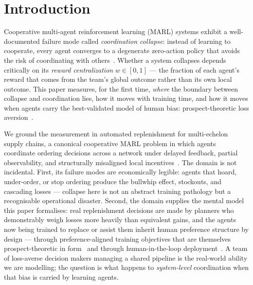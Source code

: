 \documentclass[11pt]{article}
\begin{document}
\section{Introduction}
\label{sec:intro}

Cooperative multi-agent reinforcement learning (MARL) systems exhibit a
well-documented failure mode called \emph{coordination collapse}: instead
of learning to cooperate, every agent converges to a degenerate
zero-action policy that avoids the risk of coordinating with
others~\citep{liu2023lazy,peng2023curo}.
Whether a system collapses depends critically on its \emph{reward
centralization} $w \in [0,1]$ --- the fraction of each agent's reward
that comes from the team's global outcome rather than its own local
outcome.
This paper measures, for the first time, \emph{where} the boundary
between collapse and coordination lies, how it moves with training time,
and how it moves when agents carry the best-validated model of human
bias: prospect-theoretic loss aversion~\citep{kahneman1979,tversky1992}.

We ground the measurement in automated replenishment for multi-echelon
supply chains, a canonical cooperative MARL problem in which agents
coordinate ordering decisions across a network under delayed feedback,
partial observability, and structurally misaligned local
incentives~\citep{oroojlooyjadid2022,gijsbrechts2022}.
The domain is not incidental.
First, its failure modes are economically legible: agents that hoard,
under-order, or stop ordering produce the bullwhip effect, stockouts, and
cascading losses --- collapse here is not an abstract training pathology
but a recognisable operational disaster.
Second, the domain supplies the mental model this paper formalises:
real replenishment decisions are made by planners who demonstrably weigh
losses more heavily than equivalent gains, and the agents now being
trained to replace or assist them inherit human preference structure by
design --- through preference-aligned training objectives that are
themselves prospect-theoretic in form~\citep{ethayarajh2024kto} and
through human-in-the-loop deployment~\citep{lalmohammed2025}.
A team of loss-averse decision makers managing a shared pipeline is the
real-world ability we are modelling; the question is what happens to
\emph{system-level} coordination when that bias is carried by learning
agents.
\end{document}
